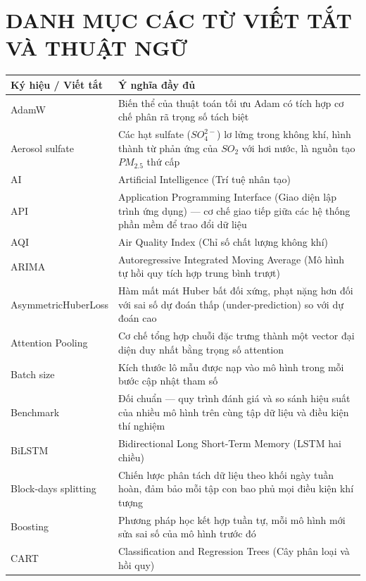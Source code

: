 \chapter*{DANH MỤC CÁC TỪ VIẾT TẮT VÀ THUẬT NGỮ}

\begin{longtable}{p{4.2cm} p{10.3cm}}
    \toprule
    \textbf{Ký hiệu / Viết tắt} & \textbf{Ý nghĩa đầy đủ} \\
    \midrule
    \endfirsthead

    AdamW & Biến thể của thuật toán tối ưu Adam có tích hợp cơ chế phân rã trọng số tách biệt \\
    Aerosol sulfate & Các hạt sulfate ($SO_4^{2-}$) lơ lửng trong không khí, hình thành từ phản ứng của $SO_2$ với hơi nước, là nguồn tạo $PM_{2.5}$ thứ cấp \\
    AI & Artificial Intelligence (Trí tuệ nhân tạo) \\
    API & Application Programming Interface (Giao diện lập trình ứng dụng) --- cơ chế giao tiếp giữa các hệ thống phần mềm để trao đổi dữ liệu \\
    AQI & Air Quality Index (Chỉ số chất lượng không khí) \\
    ARIMA & Autoregressive Integrated Moving Average (Mô hình tự hồi quy tích hợp trung bình trượt) \\
    AsymmetricHuberLoss & Hàm mất mát Huber bất đối xứng, phạt nặng hơn đối với sai số dự đoán thấp (under-prediction) so với dự đoán cao \\
    Attention Pooling & Cơ chế tổng hợp chuỗi đặc trưng thành một vector đại diện duy nhất bằng trọng số attention \\
    Batch size & Kích thước lô mẫu được nạp vào mô hình trong mỗi bước cập nhật tham số \\
    Benchmark & Đối chuẩn --- quy trình đánh giá và so sánh hiệu suất của nhiều mô hình trên cùng tập dữ liệu và điều kiện thí nghiệm \\
    BiLSTM & Bidirectional Long Short-Term Memory (LSTM hai chiều) \\
    Block-days splitting & Chiến lược phân tách dữ liệu theo khối ngày tuần hoàn, đảm bảo mỗi tập con bao phủ mọi điều kiện khí tượng \\
    Boosting & Phương pháp học kết hợp tuần tự, mỗi mô hình mới sửa sai số của mô hình trước đó \\
    CART & Classification and Regression Trees (Cây phân loại và hồi quy) \\

\end{longtable}
